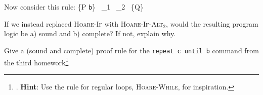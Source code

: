 \documentclass[12pt]{article}
\newenvironment{problem}[2][Problem]{\begin{trivlist}
\item[\hskip \labelsep {\bfseries #1}\hskip \labelsep {\bfseries #2.}]}{\end{trivlist}}
\begin{document}
  \begin{problem}{3 (1 point)}
    Now consider this rule:
  {\vdash \{P \land \lstinline|b|\}~ _1~ _2  ~\{Q\}}

  If we instead replaced \textsc{Hoare-If} with \textsc{Hoare-If-Alt$_2$},
  would the resulting program logic be a) sound and b) complete?
  If not, explain why.
  \end{problem}
\vspace{6cm}

\pagebreak

  \begin{problem}{4 (3 points)}
    Give a (sound and complete) proof rule for the
    \lstinline|repeat c until b| command from the third
    homework\footnote{. \textbf{Hint}: Use the rule for regular loops,
      \textsc{Hoare-While}, for inspiration.}
  \end{problem}
\end{document}
